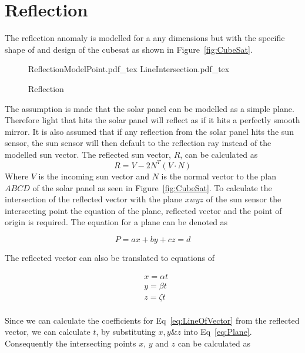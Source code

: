 \documentclass[letterpaper, 10 pt, conference]{ieeeconf}  %
\begin{document}
\section{Reflection}
\label{section:Reflection}
The reflection anomaly is modelled for a any dimensions but with the specific shape of and design of the cubesat as shown in Figure~\ref{fig:CubeSat}.

\begin{figure*}[!hbt]
	\centering
	\def\svgwidth{7cm}
	{ReflectionModelPoint.pdf_tex}
	\centering
	\def\svgwidth{7cm}
	{LineIntersection.pdf_tex}
	\caption{Reflection}
	\label{fig:LineIntersection}
\end{figure*}

The assumption is made that the solar panel can be modelled as a simple plane. Therefore light that hits the solar panel will reflect as if it hits a perfectly smooth mirror. It is also assumed that if any reflection from the solar panel hits the sun sensor, the sun sensor will then default to the reflection ray instead of the modelled sun vector. The reflected sun vector, $R$, can be calculated as
\begin{equation}
	R = V - 2N^T(V \cdot N)
\end{equation}
Where $V$ is the incoming sun vector and $N$ is the normal vector to the plan $ABCD$ of the solar panel as seen in Figure~\ref{fig:CubeSat}. To calculate the intersection of the reflected vector with the plane $xwyz$ of the sun sensor the intersecting point the equation of the plane, reflected vector and the point of origin is required. The equation for a plane can be denoted as 

\begin{equation}
	P = ax + by + cz = d
	\label{eq:Plane}
\end{equation}

The reflected vector can also be translated to equations of 

\begin{equation}
	\begin{aligned}
	&	x = \alpha t \\
	&	y = \beta t \\
	&	z = \zeta t \\
	\end{aligned}
\label{eq:LineOfVector}
\end{equation}

Since we can calculate the coefficients for Eq~\ref{eq:LineOfVector} from the reflected vector, we can calculate $t$, by substituting $x, y \& z$ into Eq~\ref{eq:Plane}. Consequently the intersecting points $x$, $y$ and $z$ can be calculated as
\end{document}
